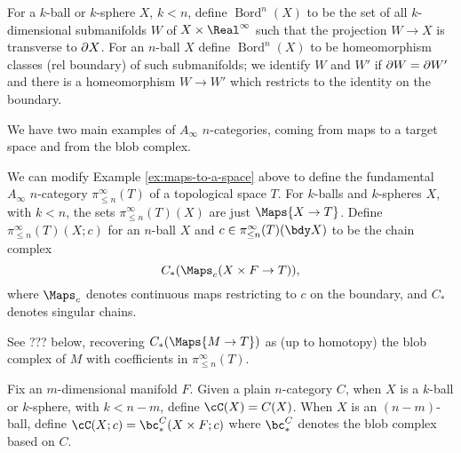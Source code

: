 \newcommand{\Bord}{\operatorname{Bord}}
\begin{example}
\rm
\label{ex:bordism-category}
For a $k$-ball or $k$-sphere $X$, $k<n$, define $\Bord^n(X)$ to be the set of all $k$-dimensional
submanifolds $W$ of $X\times \Real^\infty$ such that the projection $W \to X$ is transverse
to $\partial X$.
For an $n$-ball $X$ define $\Bord^n(X)$ to be homeomorphism classes (rel boundary) of such submanifolds;
we identify $W$ and $W'$ if $\partial W = \partial W'$ and there is a homeomorphism
$W \to W'$ which restricts to the identity on the boundary.
\end{example}




We have two main examples of $A_\infty$ $n$-categories, coming from maps to a target space and from the blob complex.

\begin{example}
\rm
\label{ex:chains-of-maps-to-a-space}
We can modify Example \ref{ex:maps-to-a-space} above to define the fundamental $A_\infty$ $n$-category $\pi^\infty_{\le n}(T)$ of a topological space $T$.
For $k$-balls and $k$-spheres $X$, with $k < n$, the sets $\pi^\infty_{\leq n}(T)(X)$ are just $\Maps{X \to T}$.
Define $\pi^\infty_{\leq n}(T)(X; c)$ for an $n$-ball $X$ and $c \in \pi^\infty_{\leq n}(T)(\bdy X)$ to be the chain complex
$$C_*(\Maps_c(X\times F \to T)),$$ where $\Maps_c$ denotes continuous maps restricting to $c$ on the boundary,
and $C_*$ denotes singular chains.
\end{example}

See ??? below, recovering $C_*(\Maps{M \to T})$ as (up to homotopy) the blob complex of $M$ with coefficients in $\pi^\infty_{\le n}(T)$.

\begin{example}
\rm
\label{ex:blob-complexes-of-balls}
Fix an $m$-dimensional manifold $F$.
Given a plain $n$-category $C$, 
when $X$ is a $k$-ball or $k$-sphere, with $k<n-m$, define $\cC(X) = C(X)$. When $X$ is an $(n-m)$-ball,
define $\cC(X; c) = \bc^C_*(X\times F; c)$
where $\bc^C_*$ denotes the blob complex based on $C$.
\end{example}

